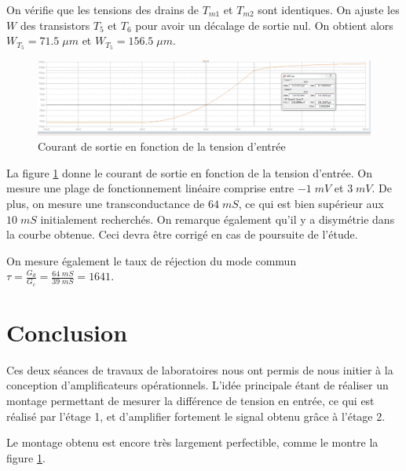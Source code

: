 \documentclass[french]{article}
\begin{document}
On vérifie que les tensions des drains de $T_{m1}$ et $T_{m2}$ sont identiques. On ajuste les $W$ des transistors $T_5$ et $T_6$ pour avoir un décalage de sortie nul. On obtient alors $\boxed{W_{T_5} = 71.5 \; \mu m}$ et $\boxed{W_{T_5} = 156.5 \; \mu m}$.

\begin{figure}[h!]
	\centering
	\includegraphics[width=\textwidth]{images/AopGm.PNG}
	\caption{Courant de sortie en fonction de la tension d'entrée}
	\label{fig:gm}
\end{figure}

La figure \ref{fig:gm} donne le courant de sortie en fonction de la tension d'entrée. On mesure une plage de fonctionnement linéaire comprise entre $-1 \; mV$ et $3 \; mV$. De plus, on mesure une transconductance de $64 \; mS$, ce qui est bien supérieur aux $10 \; mS$ initialement recherchés. On remarque également qu'il y a disymétrie dans la courbe obtenue. Ceci devra être corrigé en cas de poursuite de l'étude.

On mesure également le taux de réjection du mode commun $\tau = \frac{G_d}{G_c} = \frac{64 \; mS}{39 \; mS} = 1641$.

\newpage
\FloatBarrier
\newpage
\part*{Conclusion}

Ces deux séances de travaux de laboratoires nous ont permis de nous initier à la conception d'amplificateurs opérationnels. L'idée principale étant de réaliser un montage permettant de mesurer la différence de tension en entrée, ce qui est réalisé par l'étage 1, et d'amplifier fortement le signal obtenu grâce à l'étage 2.

Le montage obtenu est encore très largement perfectible, comme le montre la figure \ref{fig:gm}.
\end{document}
